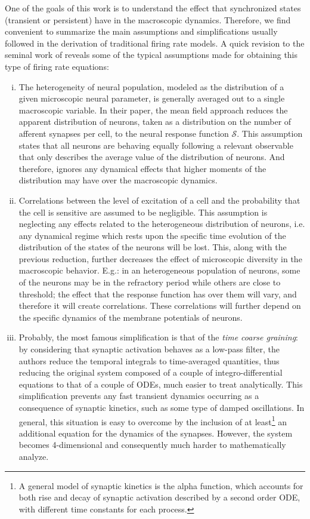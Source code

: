 One of the goals of this work is to understand the effect that
synchronized states (transient or persistent) have in the macroscopic
dynamics. Therefore, we find convenient to summarize the main
assumptions and simplifications usually followed in the derivation of traditional firing
rate models. 
A quick revision to the seminal work of \citet{Wilson1972} reveals some
of the typical assumptions made for obtaining this type of firing rate
equations: 
\begin{enumerate}[i)]
\item\label{item:1} The heterogeneity of neural population, modeled as
  the distribution of a given microscopic neural parameter,
  is generally averaged out to a single macroscopic
  variable. In their paper, the mean field approach reduces the
  apparent distribution of neurons, taken as a distribution on the
  number of afferent synapses per cell, to the neural response function
  $\mathcal{S}$. This assumption states that all
  neurons are behaving equally following a relevant observable that
  only describes the average value of the distribution of neurons. And
  therefore, ignores any dynamical effects that higher moments of the
  distribution may have over the macroscopic dynamics.
\item\label{item:2} Correlations between the level of excitation of a
  cell and the probability that the cell is sensitive are assumed to be
  negligible. This assumption is neglecting any effects related to the
  heterogeneous distribution of neurons, i.e. any dynamical regime
  which rests upon the specific time evolution of the distribution of
  the states of the neurons will be lost. This, along with the
  previous reduction, further decreases
  the effect of microscopic diversity in the macroscopic
  behavior. E.g.: in an heterogeneous population of neurons, some of
  the neurons may be in the refractory period while others are close to
  threshold; the effect that the response function has over them will
  vary, and therefore it will create correlations. These correlations
  will further depend on the specific dynamics of the membrane
  potentials of neurons.
\item\label{item:3} Probably, the most famous simplification is that of
  the \textit{time coarse graining}: by considering that synaptic
  activation behaves as a low-pass filter, the authors reduce the temporal
  integrals to time-averaged quantities, thus reducing the original
  system composed of a couple of integro-differential equations to
  that of a couple of ODEs, much easier to treat analytically. This
  simplification prevents any fast transient dynamics occurring as a
  consequence of synaptic kinetics, such as some type of damped
  oscillations. In general, this situation is easy to overcome by the
  inclusion of at least\footnote{A general model of synaptic kinetics
    is the alpha function, which accounts for both rise and decay of
    synaptic activation described by a second order ODE, with
    different time constants for each process.} 
  an additional equation for the dynamics of the synapses. However,
  the system becomes 4-dimensional and consequently much harder to
  mathematically analyze. 
\end{enumerate}

